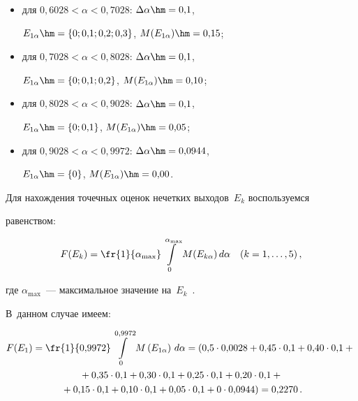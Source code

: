 \begin{itemize}
$E_{1\alpha}\hm= \{0; 0{,}1; 0{,}2; 0{,}3; 0{,}4\}$, 

$M(E_{1\alpha})\hm=0{,}20$; 

\item для $0{,}6028 < \alpha < 0{,}7028$: $\Delta\alpha\hm= 0{,}1$, 

$E_{1\alpha}\hm= \{0; 0{,}1; 0{,}2; 0{,}3\}$, $M(E_{1\alpha})\hm =0{,}15$; 

\item для $0{,}7028 < \alpha < 0{,}8028$: $\Delta\alpha\hm= 0{,}1$, 

$E_{1\alpha}\hm= \{0; 0{,}1; 0{,}2\}$, $M(E_{1\alpha})\hm =0{,}10$; 

\item для $0{,}8028 < \alpha < 0{,}9028$: $\Delta\alpha\hm= 0{,}1$, 

$E_{1\alpha}\hm=\{0; 0{,}1\}$, $M(E_{1\alpha})\hm= 0{,}05$; 

\item для $0{,}9028 < \alpha < 0{,}9972$: $\Delta\alpha\hm=0{,}0944$, 

$E_{1\alpha}\hm=\{0\}$, $M(E_{1\alpha})\hm =0{,}00$. 

  \end{itemize}

  

  Для нахождения точечных оценок нечетких выходов~$E_k$ воспользуемся 

равенством:



\pagebreak



\noindent

  \begin{equation*}

  F(E_k) =\fr{1}{\alpha_{\max}} \int\limits_0^{\alpha_{\max}} M(E_{k\alpha}) 

\,d\alpha\quad (k=1, \ldots , 5)\,,


  \end{equation*}

где $\alpha_{\max}$~--- максимальное значение на~$E_k$~\cite{7-rz}. 

В~данном случае имеем: 

\begin{multline*}

F(E_1) =\fr{1}{0{,}9972}\int\limits_0^{0{,}9972} M\left( 

E_{1\alpha}\right)\,d\alpha = \left( 0{,}5\cdot 0{,}0028+0{,}45\cdot 

0{,}1+0{,}40\cdot 0{,}1+{}\right.\\

{}+0{,}35\cdot 0{,}1+0{,}30\cdot 0{,}1+0{,}25\cdot 0{,}1+0{,}20\cdot 0{,}1+{}\\

\left.{}+0{,}15\cdot 0{,}1+0{,}10\cdot 0{,}1 

+0{,}05\cdot 0{,}1+0\cdot 0{,}0944\right) =0{,}2270\,.

\end{multline*}

